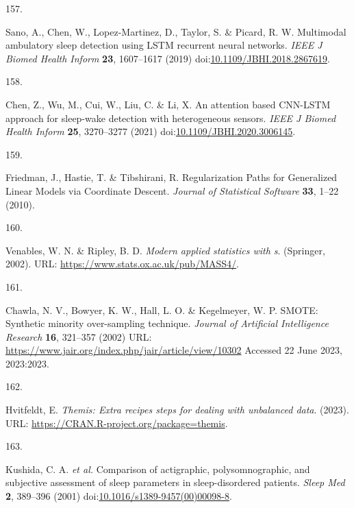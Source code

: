\documentclass[
  10pt,
]{scrbook}
\newlength{\cslhangindent}
\newlength{\csllabelwidth}
\newlength{\cslentryspacingunit} %
\newenvironment{CSLReferences}[2] %
 {%
  \setlength{\parindent}{0pt}
  \ifodd #1
  \let\oldpar\par
  \def\par{\hangindent=\cslhangindent\oldpar}
  \fi
  \setlength{\parskip}{#2\cslentryspacingunit}
 }%
 {}
\newcommand{\CSLLeftMargin}[1]{\parbox[t]{\csllabelwidth}{#1}}
\newcommand{\CSLRightInline}[1]{\parbox[t]{\linewidth - \csllabelwidth}{#1}\break}
\begin{document}
\begin{CSLReferences}{0}{0}
\leavevmode{}%
\CSLLeftMargin{157. }%
\CSLRightInline{Sano, A., Chen, W., Lopez-Martinez, D., Taylor, S. \&
Picard, R. W. Multimodal ambulatory sleep detection using {LSTM}
recurrent neural networks. \emph{{IEEE} J Biomed Health Inform}
\textbf{23}, 1607--1617 (2019)
doi:\href{https://doi.org/10.1109/JBHI.2018.2867619}{10.1109/JBHI.2018.2867619}.}

\leavevmode{}%
\CSLLeftMargin{158. }%
\CSLRightInline{Chen, Z., Wu, M., Cui, W., Liu, C. \& Li, X. An
attention based {CNN}-{LSTM} approach for sleep-wake detection with
heterogeneous sensors. \emph{{IEEE} J Biomed Health Inform} \textbf{25},
3270--3277 (2021)
doi:\href{https://doi.org/10.1109/JBHI.2020.3006145}{10.1109/JBHI.2020.3006145}.}

\leavevmode{}%
\CSLLeftMargin{159. }%
\CSLRightInline{Friedman, J., Hastie, T. \& Tibshirani, R.
Regularization Paths for Generalized Linear Models via Coordinate
Descent. \emph{Journal of Statistical Software} \textbf{33}, 1--22
(2010).}

\leavevmode{}%
\CSLLeftMargin{160. }%
\CSLRightInline{Venables, W. N. \& Ripley, B. D. \emph{Modern applied
statistics with s}. (Springer, 2002). URL:
\url{https://www.stats.ox.ac.uk/pub/MASS4/}.}

\leavevmode{}%
\CSLLeftMargin{161. }%
\CSLRightInline{Chawla, N. V., Bowyer, K. W., Hall, L. O. \& Kegelmeyer,
W. P. {SMOTE}: Synthetic minority over-sampling technique. \emph{Journal
of Artificial Intelligence Research} \textbf{16}, 321--357 (2002) URL:
\url{https://www.jair.org/index.php/jair/article/view/10302} Accessed 22
June 2023, 2023:2023.}

\leavevmode{}%
\CSLLeftMargin{162. }%
\CSLRightInline{Hvitfeldt, E. \emph{Themis: Extra recipes steps for
dealing with unbalanced data}. (2023). URL:
\url{https://CRAN.R-project.org/package=themis}.}

\leavevmode{}%
\CSLLeftMargin{163. }%
\CSLRightInline{Kushida, C. A. \emph{et al.} Comparison of actigraphic,
polysomnographic, and subjective assessment of sleep parameters in
sleep-disordered patients. \emph{Sleep Med} \textbf{2}, 389--396 (2001)
doi:\href{https://doi.org/10.1016/s1389-9457(00)00098-8}{10.1016/s1389-9457(00)00098-8}.}


\end{CSLReferences}
\end{document}
